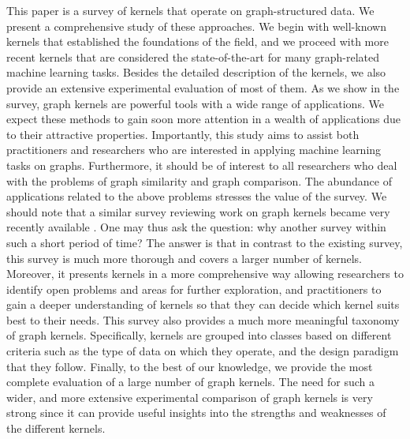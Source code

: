 \documentclass[twoside,11pt]{article}
\begin{document}
This paper is a survey of kernels that operate on graph-structured data.
We present a comprehensive study of these approaches.
We begin with well-known kernels that established the foundations of the field, and we proceed with more recent kernels that are considered the state-of-the-art for many graph-related machine learning tasks.
Besides the detailed description of the kernels, we also provide an extensive experimental evaluation of most of them.
As we show in the survey, graph kernels are powerful tools with a wide range of applications.
We expect these methods to gain soon more attention in a wealth of applications due to their attractive properties.
Importantly, this study aims to assist both practitioners and researchers who are interested in applying machine learning tasks on graphs.
Furthermore, it should be of interest to all researchers who deal with the problems of graph similarity and graph comparison.
The abundance of applications related to the above problems stresses the value of the survey.
We should note that a similar survey reviewing work on graph kernels became very recently available \cite{ghosh2018journey}.
One may thus ask the question: why another survey within such a short period of time?
The answer is that in contrast to the existing survey, this survey is much more thorough and covers a larger number of kernels.
Moreover, it presents kernels in a more comprehensive way allowing researchers to identify open problems and areas for further exploration, and practitioners to gain a deeper understanding of kernels so that they can decide which kernel suits best to their needs.
This survey also provides a much more meaningful taxonomy of graph kernels.
Specifically, kernels are grouped into classes based on different criteria such as the type of data on which they operate, and the design paradigm that they follow.
Finally, to the best of our knowledge, we provide the most complete evaluation of a large number of graph kernels.
The need for such a wider, and more extensive experimental comparison of graph kernels is very strong since it can provide useful insights into the strengths and weaknesses of the different kernels. 
\end{document}
